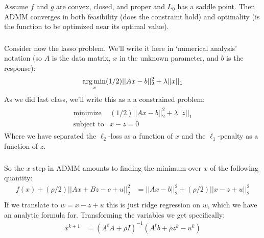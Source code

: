 \begin{frame}[fragile] \frametitle{}

Assume $f$ and $g$ are convex, closed, and proper and $L_0$ has
a saddle point. Then ADMM converges in both feasibility (does the
constraint hold) and optimality (is the function to be optimized near
its optimal value).

\end{frame}

\begin{frame}[fragile] \frametitle{}

Consider now the lasso problem. We'll write it here in `numerical analysis'
notation (so $A$ is the data matrix, $x$ in the unknown parameter, and $b$ is
the response):
\begin{align*}
\mathop{\mathrm{arg\,min}}_x (1/2) || A x - b ||_2^2 + \lambda || x ||_1
\end{align*}
As we did last class, we'll write this as a a constrained problem:
\begin{align*}
\begin{array}{ll}
\text{minimize} & (1/2) || A x - b ||_2^2 + \lambda || z ||_1 \\
\text{subject to} & x - z = 0
\end{array}
\end{align*}
Where we have separated the $\ell_2$-loss as a function of $x$ and the
$\ell_1$-penalty as a function of $z$.

\end{frame}

\begin{frame}[fragile] \frametitle{}

So the $x$-step in ADMM amounts to finding the minimum over $x$
of the following quantity:
\begin{align*}
f(x) + (\rho / 2) || Ax + Bz - c + u ||_2^2
&= ||A x - b ||_2^2 + (\rho / 2) || x - z + u ||_2^2 \\
\end{align*}
\pause If we translate to $w = x - z + u$ this is just ridge regression
on $w$, which we have an analytic formula for. Transforming the variables
we get specifically:
\begin{align*}
x^{k+1} &= (A^t A + \rho I)^{-1}  (A^t b + \rho z^k - u^k)
\end{align*}

\end{frame}


